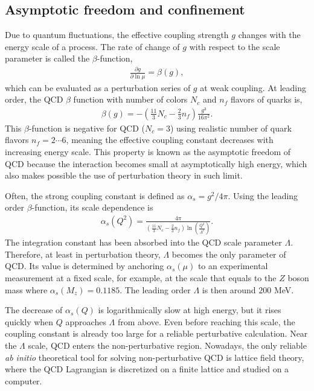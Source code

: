 \subsection{Asymptotic freedom and confinement}
Due to quantum fluctuations, the effective coupling strength $g$ changes with the energy scale of a process. 
The rate of change of $g$ with respect to the scale parameter is called the $\beta$-function,
\begin{eqnarray}
\frac{\partial g}{\partial \ln\mu} = \beta(g),
\end{eqnarray}
which can be evaluated as a perturbation series of $g$ at weak coupling.
At leading order, the QCD $\beta$ function with number of colors $N_c$ and $n_f$ flavors of quarks is,
\begin{eqnarray}
\beta(g) = - \left( \frac{11}{3}N_c - \frac{2}{3}n_f \right) \frac{g^3}{16\pi^2}.
\end{eqnarray}
This $\beta$-function is negative for QCD ($N_c=3$) using realistic number of quark flavors $n_f = 2\cdots 6$, meaning the effective coupling constant decreases with increasing energy scale.
This property is known as the asymptotic freedom of QCD because the interaction becomes small at asymptotically high energy, which also makes possible the use of perturbation theory in such limit.

Often, the strong coupling constant is defined as $\alpha_s = g^2/4\pi$.
Using the leading order $\beta$-function, its scale dependence is
\begin{eqnarray}
    \alpha_s(Q^2) = \frac{4\pi}{\left(\frac{11}{3}N_c - \frac{2}{3}n_f\right)\ln\left(\frac{Q^2}{\Lambda^2}\right)}.
\end{eqnarray}
The integration constant has been absorbed into the QCD scale parameter $\Lambda$.
Therefore, at least in perturbation theory, $\Lambda$ becomes the only parameter of QCD. 
Its value is determined by anchoring $\alpha_s(\mu)$ to an experimental measurement at a fixed scale, for example, at the scale that equals to the $Z$ boson mass where $\alpha_s(M_z) = 0.1185$.
The leading order $\Lambda$ is then around $200$ MeV.

The decrease of $\alpha_s(Q)$ is logarithmically slow at high energy, but it rises quickly when $Q$ approaches $\Lambda$ from above.
Even before reaching this scale, the coupling constant is already too large for a reliable perturbative calculation.
Near the $\Lambda$ scale, QCD enters the non-perturbative region.
Nowadays, the only reliable {\it ab initio} theoretical tool for solving non-perturbative QCD is lattice field theory, where the QCD Lagrangian is discretized on a finite lattice and studied on a computer.

